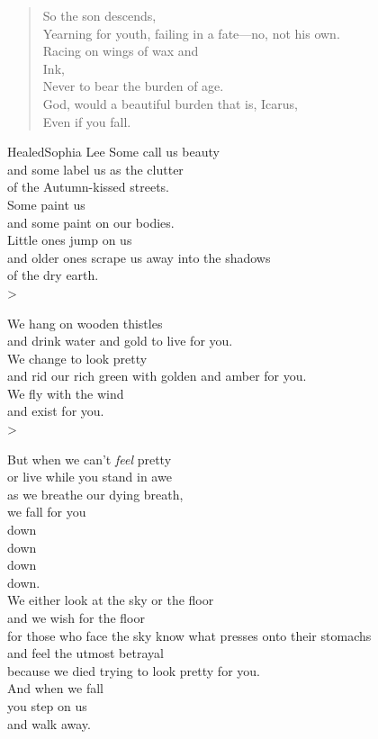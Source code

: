 \vfill

\clearpage

\begin{verse}
    So the son descends,\\
    Yearning for youth, failing in a fate—no, not his own.\\
    Racing on wings of wax and\\
    Ink,\\
    Never to bear the burden of age.\\
    God, would a beautiful burden that is, Icarus,\\
    Even if you fall.\\
\end{verse}

\clearpage

\begin{poetry}{Healed}{Sophia Lee}
    Some call us beauty\\
    \tab{}and some label us as the clutter\\
    of the Autumn-kissed streets.\\
    \tab{}Some paint us\\
    and some paint on our bodies.\\
    \tab{}Little ones jump on us\\
    and older ones scrape us away into the shadows\\
    \tab{}of the dry earth.\\>
    
    We hang on wooden thistles\\
    \tab{}and drink water and gold to live for you.\\
    We change to look pretty\\
    \tab{}and rid our rich green with golden and amber for you.\\
    We fly with the wind\\
    \tab{}and exist for you.\\>
    
    But when we can't \textit{feel} pretty\\
    \tab{}or live while you stand in awe\\
    as we breathe our dying breath,\\
    \tab{}we fall for you\\
    down\\
    \tab{}down\\
    \tab{}\tab{}down\\
    \tab{}\tab{}\tab{}down.\\
    We either look at the sky or the floor\\
    \tab{}and we wish for the floor\\
    for those who face the sky know what presses onto their stomachs\\
    \tab{}and feel the utmost betrayal\\
    because we died trying to look pretty for you.\\
    \tab{}And when we fall\\
    you step on us\\
    \tab{}and walk away.
\end{poetry}
\filbreak

